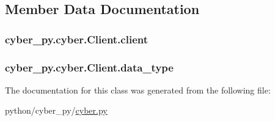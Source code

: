 \subsection{Member Data Documentation}
\hypertarget{classcyber__py_1_1cyber_1_1Client_a10e86dbb94c8268317dda6736d082b9e}{
\subsubsection[{client}]{\setlength{\rightskip}{0pt plus 5cm}cyber\-\_\-py.\-cyber.\-Client.\-client}}\label{classcyber__py_1_1cyber_1_1Client_a10e86dbb94c8268317dda6736d082b9e}
\hypertarget{classcyber__py_1_1cyber_1_1Client_ac47309e59a536f1906adea30181e2562}{
\subsubsection[{data\-\_\-type}]{\setlength{\rightskip}{0pt plus 5cm}cyber\-\_\-py.\-cyber.\-Client.\-data\-\_\-type}}\label{classcyber__py_1_1cyber_1_1Client_ac47309e59a536f1906adea30181e2562}


The documentation for this class was generated from the following file\-:\begin{DoxyCompactItemize}
\item 
python/cyber\-\_\-py/\hyperlink{cyber_8py}{cyber.\-py}\end{DoxyCompactItemize}
